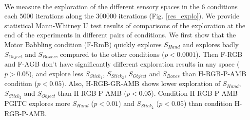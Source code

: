 \documentclass[10pt,letterpaper]{article}
\begin{document}
	\paragraph{}
	We measure the exploration of the different sensory spaces in the $6$ conditions each $5000$ iterations along the $300000$ iterations (Fig. \ref{res_explo}).
	We provide statistical Mann-Whitney U test results of comparisons of the exploration at the end of the experiments in different pairs of conditions.
	We first show that the Motor Babbling condition (F-RmB) quickly explores $S_{Hand}$ and explores badly $S_{Object}$ and $S_{Boxes}$, compared to the other conditions ($p<0.0001$).
	Then F-RGB and F-AGB don't have significantly different exploration results in any space ($p>0.05$), 
	and explore less $S_{Stick_1}$, $S_{Stick_2}$, $S_{Object}$ and $S_{Boxes}$ than H-RGB-P-AMB condition ($p<0.05$).
	Also, H-RGB-GR-AMB shows lower exploration of $S_{Hand}$, $S_{Stick_2}$ and $S_{Object}$ than H-RGB-P-AMB ($p<0.05$).
	Condition H-RGB-P-AMB-PGITC explores more $S_{Hand}$ ($p<0.01$) and $S_{Stick_2}$ ($p<0.05$) than condition H-RGB-P-AMB.
	
\end{document}
